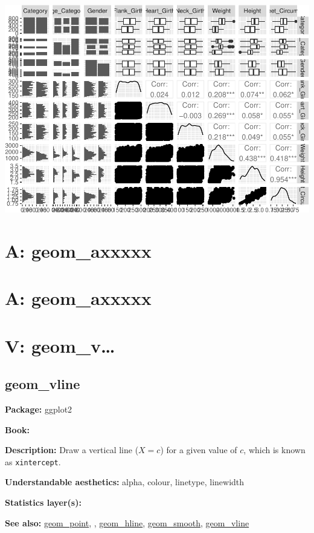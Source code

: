 \documentclass[
]{book}
\begin{document}
\includegraphics{Data-Visualisation-geom-Encyclopedia_files/figure-latex/unnamed-chunk-54-1.pdf}

\hypertarget{a-geom_axxxxx-7}{%
\chapter{A: geom\_axxxxx}\label{a-geom_axxxxx-7}}

\hypertarget{a-geom_axxxxx-8}{%
\chapter{A: geom\_axxxxx}\label{a-geom_axxxxx-8}}

\hypertarget{v-geom_v}{%
\chapter{V: geom\_v\ldots{}}\label{v-geom_v}}

\hypertarget{vline}{%
\section{geom\_vline}\label{vline}}

\textbf{Package: } ggplot2 \autocite{R-ggplot2}

\textbf{Book: }

\textbf{Description: } Draw a vertical line (\(X=c\)) for a given value of \(c\), which is known as \texttt{xintercept}.

\textbf{Understandable aesthetics:} alpha, colour, linetype, linewidth

\textbf{Statistics layer(s):}

\textbf{See also: } \protect\hyperlink{point}{geom\_point}, , \protect\hyperlink{hline}{geom\_hline}, \protect\hyperlink{smooth}{geom\_smooth}, \protect\hyperlink{vline}{geom\_vline}
\end{document}
